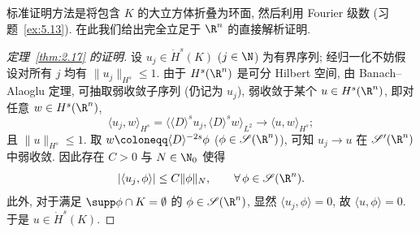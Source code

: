 标准证明方法是将包含 $K$ 的大立方体折叠为环面, 然后利用 Fourier 级数 (习题~\ref{ex:5.13}). 在此我们给出完全立足于 $\R^n$ 的直接解析证明.

\begin{proof}[定理~\ref{thm:2.17} 的证明]
设 $u_j \in \dot{H}^s(K)$ ($j \in \N$) 为有界序列; 经归一化不妨假设对所有 $j$ 均有 $\|u_j\|_{H^s} \le 1$. 由于 $H^s(\R^n)$ 是可分 Hilbert 空间, 由 Banach--Alaoglu 定理, 可抽取弱收敛子序列 (仍记为 $u_j$), 弱收敛于某个 $u \in H^s(\R^n)$, 即对任意 $w \in H^s(\R^n)$,
\begin{equation}\label{eq:2.40}
    \langle u_j, w \rangle_{H^s} = \langle \langle D \rangle^s u_j, \langle D \rangle^s w \rangle_{L^2} \to \langle u, w \rangle_{H^s};
\end{equation}
且 $\|u\|_{H^s} \le 1$. 取 $w \defeq \langle D \rangle^{-2s} \phi$ ($\phi \in \Schwartz(\R^n)$), 可知 $u_j \to u$ 在 $\TempDistr(\R^n)$ 中弱收敛. 因此存在 $C > 0$ 与 $N \in \N_0$ 使得
\begin{equation}\label{eq:2.41}
    |\langle u_j, \phi \rangle| \le C \|\phi\|_N, \qquad \forall\,\phi \in \Schwartz(\R^n).
\end{equation}
此外, 对于满足 $\supp \phi \cap K = \emptyset$ 的 $\phi \in \Schwartz(\R^n)$, 显然 $\langle u_j, \phi \rangle = 0$, 故 $\langle u, \phi \rangle = 0$. 于是 $u \in \dot{H}^s(K)$.


\end{proof}
